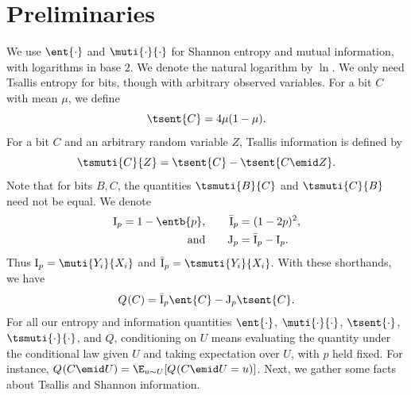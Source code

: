 \section{Preliminaries}
\label{sec:preliminaries}
We use $\ent{\cdot}$ and $\muti{\cdot}{\cdot}$ for Shannon
entropy and mutual information, with logarithms in base $2$.
We denote the natural logarithm by $\ln$. We only need
Tsallis entropy for bits, though with arbitrary observed
variables. For a bit $C$ with mean $\mu$, we define
\begin{equation*}
  \tsent{C}=4\mu(1-\mu).
\end{equation*}
For a bit $C$ and an arbitrary random variable $Z$,
Tsallis information is defined by
\begin{equation*}
  \tsmuti{C}{Z}=\tsent{C}-\tsent{C\emid Z}.
\end{equation*}
Note that for bits $B,C$, the quantities
$\tsmuti{B}{C}$ and $\tsmuti{C}{B}$ need
not be equal. We denote
\begin{equation*}
\begin{aligned}
  \sI=1-\entb{p},\qquad \qI&=(1-2p)^2,\\
  \text{and}\qquad \qJ&=\qI-\sI.
\end{aligned}
\end{equation*}
Thus $\sI=\muti{Y_i}{X_i}$ and $\qI=\tsmuti{Y_i}{X_i}$.
With these shorthands, we have
\begin{equation*}
  \qent{C}=\qI\ent{C}-\qJ\tsent{C}.
\end{equation*}
For all our entropy and information quantities
$\ent{\cdot}$, $\muti{\cdot}{\cdot}$, $\tsent{\cdot}$,
$\tsmuti{\cdot}{\cdot}$, and $Q$, conditioning on $U$ means
evaluating the quantity under the conditional law given $U$
and taking expectation over $U$, with $p$ held fixed.
For instance,
$\qent{C\emid U} = \E_{u\sim U}[\qent{C\emid U=u}]$.
Next, we gather some facts about Tsallis and Shannon
information.

